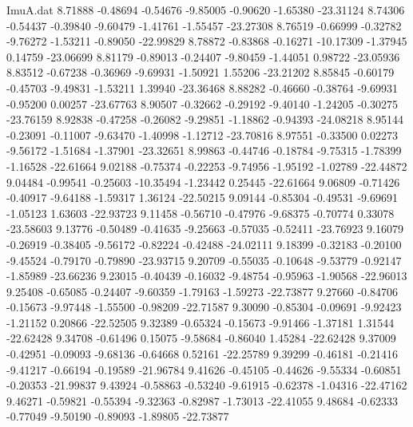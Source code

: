 \begin{filecontents}{ImuA.dat}
   8.71888   -0.48694   -0.54676   -9.85005   -0.90620   -1.65380  -23.31124
   8.74306   -0.54437   -0.39840   -9.60479   -1.41761   -1.55457  -23.27308
   8.76519   -0.66999   -0.32782   -9.76272   -1.53211   -0.89050  -22.99829
   8.78872   -0.83868   -0.16271  -10.17309   -1.37945    0.14759  -23.06699
   8.81179   -0.89013   -0.24407   -9.80459   -1.44051    0.98722  -23.05936
   8.83512   -0.67238   -0.36969   -9.69931   -1.50921    1.55206  -23.21202
   8.85845   -0.60179   -0.45703   -9.49831   -1.53211    1.39940  -23.36468
   8.88282   -0.46660   -0.38764   -9.69931   -0.95200    0.00257  -23.67763
   8.90507   -0.32662   -0.29192   -9.40140   -1.24205   -0.30275  -23.76159
   8.92838   -0.47258   -0.26082   -9.29851   -1.18862   -0.94393  -24.08218
   8.95144   -0.23091   -0.11007   -9.63470   -1.40998   -1.12712  -23.70816
   8.97551   -0.33500    0.02273   -9.56172   -1.51684   -1.37901  -23.32651
   8.99863   -0.44746   -0.18784   -9.75315   -1.78399   -1.16528  -22.61664
   9.02188   -0.75374   -0.22253   -9.74956   -1.95192   -1.02789  -22.44872
   9.04484   -0.99541   -0.25603  -10.35494   -1.23442    0.25445  -22.61664
   9.06809   -0.71426   -0.40917   -9.64188   -1.59317    1.36124  -22.50215
   9.09144   -0.85304   -0.49531   -9.69691   -1.05123    1.63603  -22.93723
   9.11458   -0.56710   -0.47976   -9.68375   -0.70774    0.33078  -23.58603
   9.13776   -0.50489   -0.41635   -9.25663   -0.57035   -0.52411  -23.76923
   9.16079   -0.26919   -0.38405   -9.56172   -0.82224   -0.42488  -24.02111
   9.18399   -0.32183   -0.20100   -9.45524   -0.79170   -0.79890  -23.93715
   9.20709   -0.55035   -0.10648   -9.53779   -0.92147   -1.85989  -23.66236
   9.23015   -0.40439   -0.16032   -9.48754   -0.95963   -1.90568  -22.96013
   9.25408   -0.65085   -0.24407   -9.60359   -1.79163   -1.59273  -22.73877
   9.27660   -0.84706   -0.15673   -9.97448   -1.55500   -0.98209  -22.71587
   9.30090   -0.85304   -0.09691   -9.92423   -1.21152    0.20866  -22.52505
   9.32389   -0.65324   -0.15673   -9.91466   -1.37181    1.31544  -22.62428
   9.34708   -0.61496    0.15075   -9.58684   -0.86040    1.45284  -22.62428
   9.37009   -0.42951   -0.09093   -9.68136   -0.64668    0.52161  -22.25789
   9.39299   -0.46181   -0.21416   -9.41217   -0.66194   -0.19589  -21.96784
   9.41626   -0.45105   -0.44626   -9.55334   -0.60851   -0.20353  -21.99837
   9.43924   -0.58863   -0.53240   -9.61915   -0.62378   -1.04316  -22.47162
   9.46271   -0.59821   -0.55394   -9.32363   -0.82987   -1.73013  -22.41055
   9.48684   -0.62333   -0.77049   -9.50190   -0.89093   -1.89805  -22.73877

\end{filecontents}
